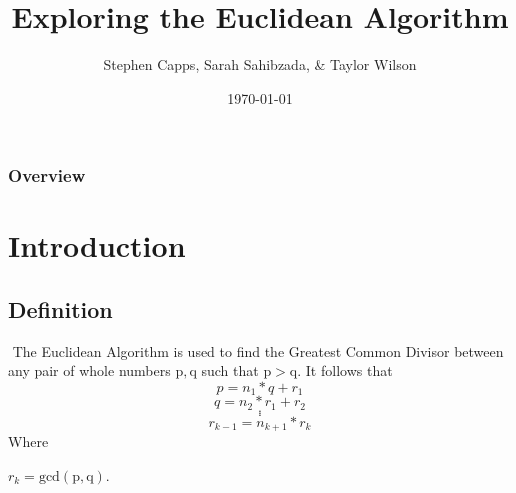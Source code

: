 \documentclass{beamer}
\title[Euclidean Algorithm]{Exploring the Euclidean Algorithm} %
\author{Stephen Capps, Sarah Sahibzada, \& Taylor Wilson} %
\institute[TAMU] %
{
Texas A\&{}M University \\ %
\medskip
\textit{Supurvisor: Sara Pollock} %
}
\date{\today} %
\begin{document}
\begin{frame}
\titlepage %
\end{frame}

\begin{frame}
\frametitle{Overview} %
\tableofcontents %
\end{frame}


\section{Introduction}
\subsection{Definition}
\begin{frame} $ $
\indent The Euclidean Algorithm is used to find the Greatest Common Divisor between any pair of whole numbers $\mathrm{p, q}$ such that $\mathrm{p>q}$.
\indent It follows that 
$$p = n_1*q + r_1$$ 
$$q = n_2*r_1 + r_2$$
$$.$$
$$.$$
$$.$$
$$r_{k-1} = n_{k+1}*r_k$$
Where \begin{center}$r_k = \mathrm{gcd(p,q)}$.\end{center}
\end{frame}
\end{document}
